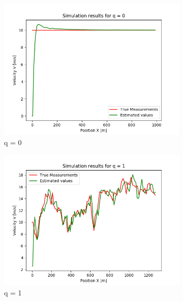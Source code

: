 \documentclass{article}
\begin{document}
        \begin{figure}[H]
            \begin{subfigure} {.3\textwidth}  
                \centering 
                \includegraphics[width=0.9\linewidth]{./img/q_0.png}
                \caption{q = 0 }
            \end{subfigure}
            \begin{subfigure}{.3\textwidth}            
                \centering
                \includegraphics[width=0.9\linewidth]{./img/q_1.png}
                \caption{q = 1}
            \end{subfigure}    
            \begin{subfigure} {.3\textwidth}         
                \centering

\end{subfigure}
\end{figure}
\end{document}
